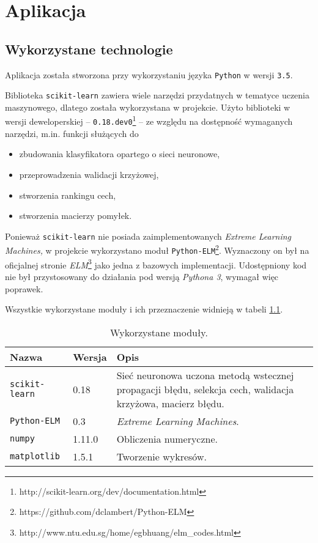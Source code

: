 \chapter{Aplikacja}

\section{Wykorzystane technologie}

Aplikacja została stworzona przy wykorzystaniu języka \texttt{Python} w wersji \texttt{3.5}.

Biblioteka \texttt{scikit-learn} zawiera wiele narzędzi przydatnych w tematyce uczenia maszynowego, dlatego została wykorzystana w projekcie.
Użyto biblioteki w wersji deweloperskiej -- \texttt{0.18.dev0}\footnote{http://scikit-learn.org/dev/documentation.html} -- ze względu na dostępność wymaganych narzędzi, m.in. funkcji służących do
\begin{itemize}
	\item{zbudowania klasyfikatora opartego o sieci neuronowe,}
	\item{przeprowadzenia walidacji krzyżowej,}
	\item{stworzenia rankingu cech,}
	\item{stworzenia macierzy pomyłek.}
\end{itemize}

Ponieważ \texttt{scikit-learn} nie posiada zaimplementowanych \textit{Extreme Learning Machines,} w projekcie wykorzystano moduł \texttt{Python-ELM}\footnote{https://github.com/dclambert/Python-ELM}. 
Wyznaczony on był na oficjalnej stronie \textit{ELM}\footnote{http://www.ntu.edu.sg/home/egbhuang/elm\_codes.html} jako jedna z bazowych implementacji.
Udostępniony kod nie był przystosowany do działania pod wersją \textit{Pythona 3}, wymagał więc poprawek.

Wszystkie wykorzystane moduły i ich przeznaczenie widnieją w tabeli \ref{tab:usedmodules}.

\begin{table}[h!]
    \centering
    \caption{Wykorzystane moduły.}
    \label{tab:usedmodules}
    \begin{tabular}{p{3cm}p{2cm}p{11cm}}
        \toprule
        \textbf{Nazwa} & \textbf{Wersja} & \textbf{Opis} \\
        \midrule
        \texttt{scikit-learn} & 0.18 & Sieć neuronowa uczona metodą wstecznej propagacji błędu, selekcja cech, walidacja krzyżowa, macierz błędu. \\
        \texttt{Python-ELM} & 0.3 & \textit{Extreme Learning Machines}. \\
        \texttt{numpy} & 1.11.0 & Obliczenia numeryczne. \\
        \texttt{matplotlib} & 1.5.1 & Tworzenie wykresów. \\
        \bottomrule
    \end{tabular}
\end{table}

